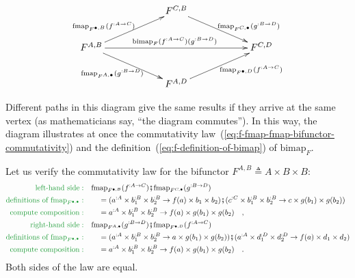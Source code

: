 \begin{wrapfigure}{l}{0.5\columnwidth}%
\vspace{-1.5\baselineskip}
\[
\xymatrix{\xyScaleY{2.0pc}\xyScaleX{5.0pc} & F^{C,B}\ar[rd]\sp(0.6){\ ~~\text{fmap}_{F^{C,\bullet}}(g^{:B\rightarrow D})}\\
F^{A,B}\ar[ru]\sp(0.4){\text{fmap}_{F^{\bullet,B}}(f^{:A\rightarrow C})~~~}\ar[rd]\sb(0.5){\text{fmap}_{F^{A,\bullet}}(g^{:B\rightarrow D})~~\ }\ar[rr]\sp(0.5){\text{bimap}_{F}(f^{:A\rightarrow C})(g^{:B\rightarrow D})\ } &  & F^{C,D}\\
 & F^{A,D}\ar[ru]\sb(0.6){~~~~\text{fmap}_{F^{\bullet,D}}(f^{:A\rightarrow C})}
}
\]

\vspace{-2.2\baselineskip}
\end{wrapfigure}%
Different paths in this diagram give the same results if they arrive
at the same vertex (as mathematicians say, \textsf{``}the diagram commutes\textsf{''}).
In this way, the diagram illustrates at once the commutativity law~(\ref{eq:f-fmap-fmap-bifunctor-commutativity})
and the definition~(\ref{eq:f-definition-of-bimap}) of $\text{bimap}_{F}$.

Let us verify the commutativity law for the bifunctor
$F^{A,B}\triangleq A\times B\times B$:
\begin{align*}
{\color{greenunder}\text{left-hand side}:}\quad & \text{fmap}_{F^{\bullet,B}}(f^{:A\rightarrow C})\bef\text{fmap}_{F^{C,\bullet}}(g^{:B\rightarrow D})\\
{\color{greenunder}\text{definitions of }\text{fmap}_{F^{\bullet,\bullet}}:}\quad & \quad=(a^{:A}\times b_{1}^{:B}\times b_{2}^{:B}\rightarrow f(a)\times b_{1}\times b_{2})\bef(c^{:C}\times b_{1}^{:B}\times b_{2}^{:B}\rightarrow c\times g(b_{1})\times g(b_{2}))\\
{\color{greenunder}\text{compute composition}:}\quad & \quad=a^{:A}\times b_{1}^{:B}\times b_{2}^{:B}\rightarrow f(a)\times g(b_{1})\times g(b_{2})\quad,\\
{\color{greenunder}\text{right-hand side}:}\quad & \text{fmap}_{F^{A,\bullet}}(g^{:B\rightarrow D})\bef\text{fmap}_{F^{\bullet,D}}(f^{:A\rightarrow C})\\
{\color{greenunder}\text{definitions of }\text{fmap}_{F^{\bullet,\bullet}}:}\quad & \quad=(a^{:A}\times b_{1}^{:B}\times b_{2}^{:B}\rightarrow a\times g(b_{1})\times g(b_{2}))\bef(a^{:A}\times d_{1}^{:D}\times d_{2}^{:D}\rightarrow f(a)\times d_{1}\times d_{2})\\
{\color{greenunder}\text{compute composition}:}\quad & \quad=a^{:A}\times b_{1}^{:B}\times b_{2}^{:B}\rightarrow f(a)\times g(b_{1})\times g(b_{2})\quad.
\end{align*}
Both sides of the law are equal.


